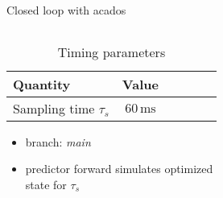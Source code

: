 \documentclass[10pt,aspectratio=1610]{beamer} %
\begin{document}
\begin{frame}{Closed loop with acados}
	\begin{columns}[onlytextwidth]
		\begin{column}{0.5\textwidth}	
			\begin{table}[h!tbp]
				\small
				\begin{center}
					\begin{tabular}{lccccl}\toprule
						\textbf{Quantity} & \textbf{Value}\\
						\midrule
						Sampling time $\tau_{s}$ &$60\,\mathrm{ms}$\\
						\bottomrule
					\end{tabular}
				\end{center}
				\caption{Timing parameters}
			\end{table}
			\begin{itemize}[label=\textbullet]
				\item branch: \textit{main}
				\item predictor forward simulates optimized \\state for $\tau_{s}$
			\end{itemize}
		\end{column}

		\begin{column}{0.5\textwidth}
			\begin{center}
			\def\svgwidth{1.0\textwidth}
			
			\end{center}
		\end{column}
	\end{columns}
\end{frame}
\end{document}
